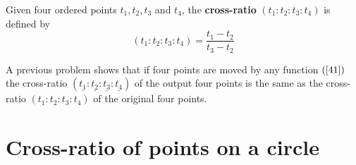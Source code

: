 \documentclass{ximera}
\begin{document}
\begin{definition}
\label{44}Given four ordered points $t_{1},t_{2},t_{3}$ and $t_{4}$, the \textbf{cross-ratio} $\left(t_{1}:t_{2}:t_{3}:t_{4}\right)$ is defined by
\[
\left( t_{1}:t_{2}:t_{3}:t_{4}\right)
=\frac{t_{1}-t_{2}}{t_{3}-t_{2}}%
\]

\end{definition}

A previous problem shows that if four points are moved by any function $\left(
\ref{41}\right)  $ the cross-ratio $\left(  \underline{t_{1}}:\underline
{t_{2}}:\underline{t_{3}}:\underline{t_{4}}\right)  $ of the output four
points is the same as the cross-ratio $\left(  t_{1}:t_{2}:t_{3}:t_{4}\right)
$ of the original four points.












\section*{Cross-ratio of points on a circle}
\end{document}
